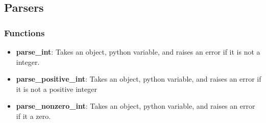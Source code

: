 \documentclass{article}
\begin{document}
\subsection{Parsers}
\subsubsection{Functions}
\begin{itemize}
	\item \textbf{parse\_int}: Takes an object, python variable, and raises an error if it is not a integer. 	
	
	\item \textbf{parse\_positive\_int}: Takes an object, python variable, and raises an error if it is not a positive integer

	\item \textbf{parse\_nonzero\_int}: Takes an object, python variable, and raises an error if it a zero.
	
\end{itemize}
\end{document}
